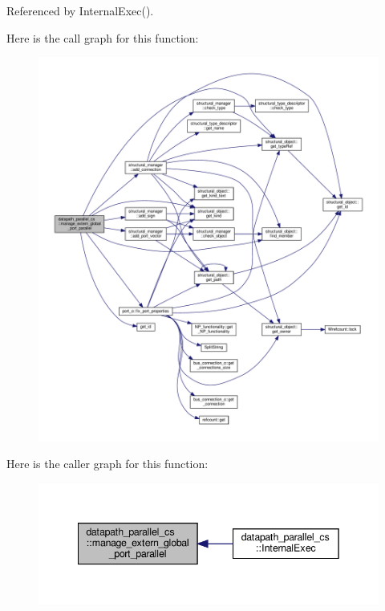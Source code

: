 Referenced by Internal\+Exec().

Here is the call graph for this function\+:
\nopagebreak
\begin{figure}[H]
\begin{center}
\leavevmode
\includegraphics[width=350pt]{d7/d60/classdatapath__parallel__cs_aa24cfc8f823ccba9194eed8aa4bfac32_cgraph}
\end{center}
\end{figure}
Here is the caller graph for this function\+:
\nopagebreak
\begin{figure}[H]
\begin{center}
\leavevmode
\includegraphics[width=342pt]{d7/d60/classdatapath__parallel__cs_aa24cfc8f823ccba9194eed8aa4bfac32_icgraph}
\end{center}
\end{figure}
\mbox{\label{classdatapath__parallel__cs_a242291d6433556127880f7baab96c641}} 
